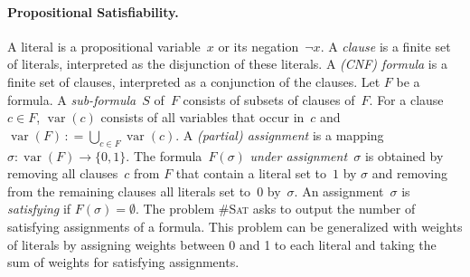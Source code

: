 \documentclass{llncs}
\newcommand{\longversion}[1]{#1}
\newcommand{\shortversion}[1]{}
\newcommand{\eqdef}{\ensuremath{\,\mathrel{\mathop:}=}}
\newcommand{\cSAT}{\textsc{\#Sat}\xspace}%
\newcommand{\WMC}{\textsc{WMC}\xspace}%
\DeclareMathOperator{\var}{var}
\begin{document}
\paragraph*{Propositional Satisfiability.}
\shortversion{%
  We define (propositional) formulas and their evaluation in the usual
  way and assume familiarity with standard notations, including
  satisfiability. For basic literature, we refer to introductory
  work~\cite{GomesKautzSabharwalSelman08a,KleineBuningLettman99}.
  \emph{Formulas} are sets of \emph{clauses}, which are sets of
  variables or the negation thereof. For a formula or clause~$X$, we
  abbreviate by $\var(X)$ the variables that occur~in~$X$.
%
  The problem \cSAT asks to output the number of satisfying
  assignments of~a~formula.  It can be generalized to \WMC by
  assigning weights between 0 and 1 to each literal and taking the sum
  of weights for satisfying assignments.
%
}
%
\longversion{%
  A literal is a propositional variable~$x$ or its negation~$\neg
  x$. A \emph{clause} is a finite set of literals, interpreted as the
  disjunction of these literals.
%
%
%
A \emph{(CNF) formula}
%
is a finite set of clauses, interpreted as a conjunction of the clauses.
%
Let $F$ be a formula. A \emph{sub-formula~$S$} of~$F$ consists of
subsets of clauses of~$F$.
%
%
%
For a clause~$c \in F$, $\var(c)$ consists of all variables that occur
in~$c$ and $\var(F)\eqdef\bigcup_{c \in F} \var(c)$.
%
A \emph{(partial) assignment} is a mapping
$\sigma: \var(F) \rightarrow \{0,1\}$.
%
%
%
%
%
%
%
The formula~$F(\sigma)$ \emph{under assignment~$\sigma$} is obtained
by removing all clauses~$c$ from $F$ that contain a literal set to~$1$
by $\sigma$ and removing from the remaining clauses all literals set
to~$0$ by~$\sigma$. An assignment~$\sigma$ is \emph{satisfying} if
$F(\sigma)=\emptyset$.
%
The problem \cSAT asks to output the number of satisfying assignments
of a formula.
%
%
This problem can be generalized with weights of literals by assigning
weights between 0 and 1 to each literal and taking the sum of weights
for satisfying assignments.
%
}
%
%
%
%
%
%
%
%
%
%
%
%
%
%
%
%
%
%
%



%

%
\end{document}
